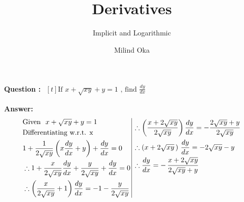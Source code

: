 \documentclass{beamer}
\title{Derivatives}
\subtitle{Implicit and Logarithmic}
\author{Milind Oka}
\begin{document}
 

\frame {
		\titlepage
	}



\frame
{
\textbf{Question :} 
$\begin{aligned}[t] 
\text{If \ } x + \sqrt{xy} + y = 1 \text{\ , \  find \ \  } \frac{dy}{dx}
\end{aligned}$

\textbf{Answer:}
\begin{equation} \nonumber
\begin{alignedat}{4}
& \text{Given \ } x + \sqrt{xy} + y = 1 \\
& \text{Differentiating w.r.t. x \ }\\
& 1 + \frac{1}{2\sqrt{xy}} \left( x\frac{dy}{dx}+y \right)+\frac{dy}{dx}=0 \\
& \therefore 1 + \frac{x}{2\sqrt{xy}} \frac{dy}{dx}+ \frac{y}{2\sqrt{xy}}+\frac{dy}{dx}=0 \\
& \therefore \left(\frac{x}{2\sqrt{xy}}+1\right) \frac{dy}{dx}=-1-\frac{y}{2\sqrt{xy}}\\
\end{alignedat}
\,
\vrule
\, 
\begin{alignedat}{4}
& \therefore \left(\frac{x+2\sqrt{xy}}{2\sqrt{xy}}\right) \frac{dy}{dx}=-\frac{2\sqrt{xy}+y}{2\sqrt{xy}}\\
& \therefore  (x+2\sqrt{xy}\,)\ \frac{dy}{dx}= -2\sqrt{xy}-y \\
& \therefore \frac{dy}{dx} =-\,\frac{x+2\sqrt{xy}}{2\sqrt{xy}+y}  \\
& \\
& \\
\end{alignedat}
\end{equation}

}

\end{document}
